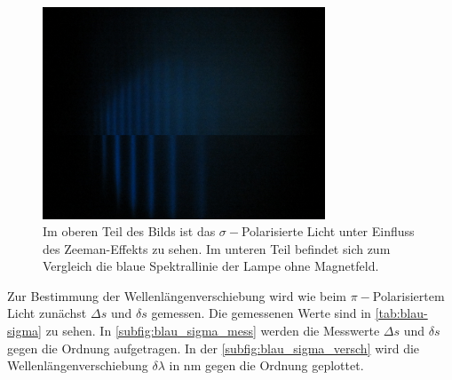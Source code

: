 \begin{figure}
    \centering
    \includegraphics[width=0.75\textwidth]{content/data/Blue_sigma_0_uebernander.JPG}
    \caption{Im oberen Teil des Bilds ist das $\sigma -$Polarisierte Licht unter Einfluss des Zeeman-Effekts zu sehen. Im unteren Teil befindet sich zum Vergleich die blaue Spektrallinie der Lampe ohne Magnetfeld.}
    \label{fig:sigma-blau}
\end{figure}

Zur Bestimmung der Wellenlängenverschiebung wird wie beim $\pi -$Polarisiertem Licht zunächst $\Delta s$ und $\delta s$ gemessen.
Die gemessenen Werte sind in \autoref{tab:blau-sigma} zu sehen.
In \autoref{subfig:blau_sigma_mess} werden die Messwerte $\Delta s$ und $\delta s$ gegen die Ordnung aufgetragen.
In der \autoref{subfig:blau_sigma_versch} wird die Wellenlängenverschiebung $\delta \lambda$ in $\si{\nano\meter}$ gegen die Ordnung geplottet. 

